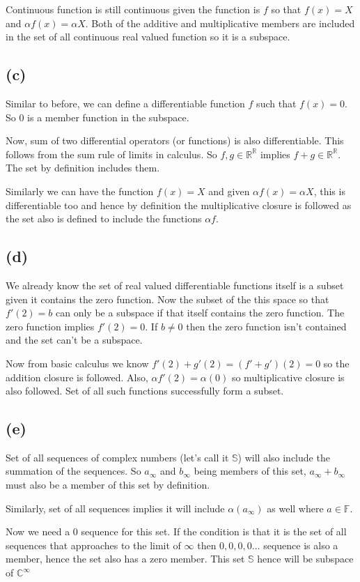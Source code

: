 \documentclass[letter]{article}
\begin{document}
 Continuous function is still continuous given the function is $f$ so that $f(x) = X$ and $ \alpha f(x) = \alpha X$. Both of the additive and multiplicative members are included in the set of all continuous real valued function so it is a subspace. 

 \subsection*{(c)}
 Similar to before, we can define a differentiable function $f$ such that $f(x) = 0$. So $0$ is a member function in the subspace. 

 Now, sum of two differential operators (or functions) is also differentiable. This follows from the sum rule of limits in calculus. So $f,g \in \mathbb{R}^{\mathbb{R}}$ implies $f+g \in \mathbb{R}^{\mathbb{R}}$. The set by definition includes them. 

 Similarly we can have the function $f(x) = X$ and given $\alpha f(x) = \alpha X$, this is differentiable too and hence by definition the multiplicative closure is followed as the set also is defined to include the functions $\alpha f$. 

 \subsection*{(d)} 
 We already know the set of real valued differentiable functions itself is a subset given it contains the zero function. Now the subset of the this space so that $f'(2) = b$ can only be a subspace if that itself contains the zero function. The zero function implies $f'(2) = 0$. If $b\neq 0$ then the zero function isn't contained and the set can't be a subspace. 

 Now from basic calculus we know $f'(2) + g'(2) = (f' + g')(2) = 0$ so the addition closure is followed. Also, $\alpha f'(2) = \alpha (0)$ so multiplicative closure is also followed. Set of all such functions successfully form a subset. 

 \subsection*{(e)	}
Set of all sequences of complex numbers (let's call it $\mathbb{S}$) will also include the summation of the sequences. So $a_\infty$ and $b_\infty$ being members of this set, $a_\infty + b_\infty$ must also be a member of this set by definition. 

Similarly, set of all sequences implies it will include $\alpha \left(a_\infty\right)$ as well where $a \in \mathbb{F}$.

Now we need a $0$ sequence for this set. If the condition is that it is the set of all sequences that approaches to the limit of $\infty$ then $0,0,0,0\ldots$ sequence is also a member, hence the set also has a zero member. This set $ \mathbb{S}$ hence will be subspace of $\mathbb{C}^{\infty}$
\end{document}
